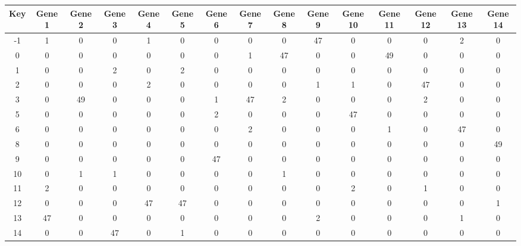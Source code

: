 \begin{tabular}{|c|c|c|c|c|c|c|c|c|c|c|c|c|c|c|}
\hline
Key & Gene 1 & Gene 2 & Gene 3 & Gene 4 & Gene 5 & Gene 6 & Gene 7 & Gene 8 & Gene 9 & Gene 10 & Gene 11 & Gene 12 & Gene 13 & Gene 14 \\
\hline
-1 & 1 & 0 & 0 & 1 & 0 & 0 & 0 & 0 & 47 & 0 & 0 & 0 & 2 & 0 \\
0 & 0 & 0 & 0 & 0 & 0 & 0 & 1 & 47 & 0 & 0 & 49 & 0 & 0 & 0 \\
1 & 0 & 0 & 2 & 0 & 2 & 0 & 0 & 0 & 0 & 0 & 0 & 0 & 0 & 0 \\
2 & 0 & 0 & 0 & 2 & 0 & 0 & 0 & 0 & 1 & 1 & 0 & 47 & 0 & 0 \\
3 & 0 & 49 & 0 & 0 & 0 & 1 & 47 & 2 & 0 & 0 & 0 & 2 & 0 & 0 \\
5 & 0 & 0 & 0 & 0 & 0 & 2 & 0 & 0 & 0 & 47 & 0 & 0 & 0 & 0 \\
6 & 0 & 0 & 0 & 0 & 0 & 0 & 2 & 0 & 0 & 0 & 1 & 0 & 47 & 0 \\
8 & 0 & 0 & 0 & 0 & 0 & 0 & 0 & 0 & 0 & 0 & 0 & 0 & 0 & 49 \\
9 & 0 & 0 & 0 & 0 & 0 & 47 & 0 & 0 & 0 & 0 & 0 & 0 & 0 & 0 \\
10 & 0 & 1 & 1 & 0 & 0 & 0 & 0 & 1 & 0 & 0 & 0 & 0 & 0 & 0 \\
11 & 2 & 0 & 0 & 0 & 0 & 0 & 0 & 0 & 0 & 2 & 0 & 1 & 0 & 0 \\
12 & 0 & 0 & 0 & 47 & 47 & 0 & 0 & 0 & 0 & 0 & 0 & 0 & 0 & 1 \\
13 & 47 & 0 & 0 & 0 & 0 & 0 & 0 & 0 & 2 & 0 & 0 & 0 & 1 & 0 \\
14 & 0 & 0 & 47 & 0 & 1 & 0 & 0 & 0 & 0 & 0 & 0 & 0 & 0 & 0 \\
\hline
\end{tabular}